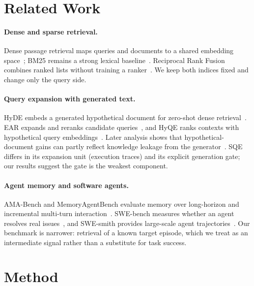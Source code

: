 \documentclass{article}
\newcommand{\sqe}{\textsc{SQE}}
\begin{document}
\section{Related Work}
\label{sec:related}

\paragraph{Dense and sparse retrieval.}
Dense passage retrieval maps queries and documents to a shared embedding
space~\cite{karpukhin2020dpr}; BM25 remains a strong lexical
baseline~\cite{robertson2009bm25}. Reciprocal Rank Fusion combines ranked
lists without training a ranker~\cite{cormack2009rrf}. We keep both indices
fixed and change only the query side.

\paragraph{Query expansion with generated text.}
HyDE embeds a generated hypothetical document for zero-shot dense
retrieval~\cite{gao2023hyde}. EAR expands and reranks candidate
queries~\cite{chuang2023ear}, and HyQE ranks contexts with hypothetical query
embeddings~\cite{zhou2024hyqe}. Later analysis shows that hypothetical-document
gains can partly reflect knowledge leakage from the generator~\cite{yoon2025hypothetical}.
\sqe{} differs in its expansion unit (execution traces) and its explicit
generation gate; our results suggest the gate is the weakest component.

\paragraph{Agent memory and software agents.}
AMA-Bench and MemoryAgentBench evaluate memory over long-horizon and incremental
multi-turn interaction~\cite{zhao2026amabench,hu2025memae}. SWE-bench measures
whether an agent resolves real issues~\cite{jimenez2024swebench}, and SWE-smith
provides large-scale agent trajectories~\cite{yang2025swesmith}. Our benchmark
is narrower: retrieval of a known target episode, which we treat as an
intermediate signal rather than a substitute for task success.

\section{Method}
\label{sec:method}
\end{document}
